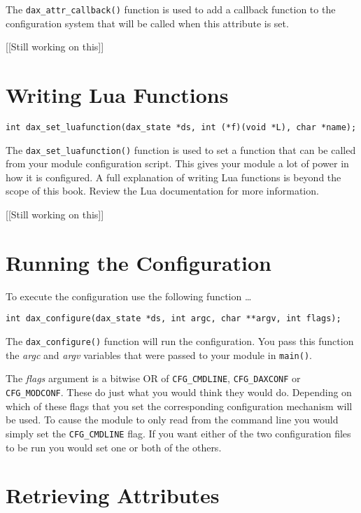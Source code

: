 The \verb|dax_attr_callback()| function is
used to add a callback function to the configuration system that will be called
when this attribute is set.

[[Still working on this]]

\section{Writing Lua Functions}

\begin{verbatim}
int dax_set_luafunction(dax_state *ds, int (*f)(void *L), char *name);
\end{verbatim}

The \verb|dax_set_luafunction()|
function is used to set a function that can be called from your module
configuration script.  This gives your module a lot of power in how it is
configured.  A full explanation of writing Lua functions is beyond the scope of
this book.  Review the Lua documentation for more information.

[[Still working on this]]

\section{Running the Configuration}
To execute the configuration use the following function \ldots
\begin{verbatim}
int dax_configure(dax_state *ds, int argc, char **argv, int flags);
\end{verbatim}

The \verb|dax_configure()| function will run
the configuration.  You pass this function the \textit{argc} and \textit{argv}
variables that were passed to your module in \verb|main()|.

The \textit{flags} argument is a bitwise OR of \verb|CFG_CMDLINE|,
\verb|CFG_DAXCONF| or \verb|CFG_MODCONF|.  These do just what you would think
they would do.  Depending on which of these flags that you set the corresponding
configuration mechanism will be used.  To cause the module to only read from the
command line you would simply set the \verb|CFG_CMDLINE| flag. If you want
either of the two configuration files to be run you would set one or both of the
others.

\section{Retrieving Attributes}

